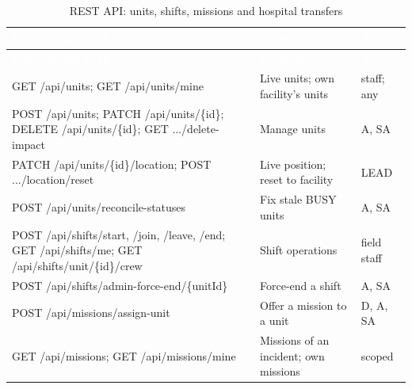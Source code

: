 {\tabfont\rowband
\begin{longtable}{@{}>{\raggedright\arraybackslash}p{}>{\raggedright\arraybackslash}p{}>{\raggedright\arraybackslash}p{}@{}}
\caption{REST API: units, shifts, missions and hospital transfers}\label{tab:api-4}\\
\rowcolor{najdanavy}\textcolor{white}{\sffamily\bfseries\small Method and path} & \textcolor{white}{\sffamily\bfseries\small Purpose} & \textcolor{white}{\sffamily\bfseries\small Access}\\
\endfirsthead
\rowcolor{najdanavy}\textcolor{white}{\sffamily\bfseries\small Method and path} & \textcolor{white}{\sffamily\bfseries\small Purpose} & \textcolor{white}{\sffamily\bfseries\small Access}\\
\endhead
\bottomrule\endlastfoot
GET /\allowbreak{}api/\allowbreak{}units; GET /\allowbreak{}api/\allowbreak{}units/\allowbreak{}mine & Live units; own facility’s units & staff; any\\
POST /\allowbreak{}api/\allowbreak{}units; PATCH /\allowbreak{}api/\allowbreak{}units/\allowbreak{}\{id\}; DELETE /\allowbreak{}api/\allowbreak{}units/\allowbreak{}\{id\}; GET .../\allowbreak{}delete-impact & Manage units & A, SA\\
PATCH /\allowbreak{}api/\allowbreak{}units/\allowbreak{}\{id\}/\allowbreak{}location; POST .../\allowbreak{}location/\allowbreak{}reset & Live position; reset to facility & LEAD\\
POST /\allowbreak{}api/\allowbreak{}units/\allowbreak{}reconcile-statuses & Fix stale BUSY units & A, SA\\
POST /\allowbreak{}api/\allowbreak{}shifts/\allowbreak{}start, /\allowbreak{}join, /\allowbreak{}leave, /\allowbreak{}end; GET /\allowbreak{}api/\allowbreak{}shifts/\allowbreak{}me; GET /\allowbreak{}api/\allowbreak{}shifts/\allowbreak{}unit/\allowbreak{}\{id\}/\allowbreak{}crew & Shift operations & field staff\\
POST /\allowbreak{}api/\allowbreak{}shifts/\allowbreak{}admin-force-end/\allowbreak{}\{unitId\} & Force-end a shift & A, SA\\
POST /\allowbreak{}api/\allowbreak{}missions/\allowbreak{}assign-unit & Offer a mission to a unit & D, A, SA\\
GET /\allowbreak{}api/\allowbreak{}missions; GET /\allowbreak{}api/\allowbreak{}missions/\allowbreak{}mine & Missions of an incident; own missions & scoped\\

\end{longtable}}
